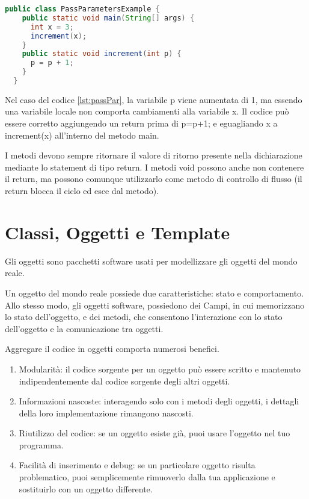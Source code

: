 \documentclass[a4paper,12pt,twoside]{book}
\begin{document}
\begin{lstlisting}[caption={Passaggio di parametri},
  label={lst:passPar},language=Java]
  public class PassParametersExample {
    public static void main(String[] args) {
      int x = 3;
      increment(x);
    }
    public static void increment(int p) {
      p = p + 1;
    }
  }
\end{lstlisting}

Nel caso del codice \ref{lst:passPar}, la variabile p viene aumentata
di 1, ma essendo una variabile locale non comporta cambiamenti alla
variabile x. Il codice può essere corretto aggiungendo un return prima
di p=p+1; e eguagliando x a increment(x) all'interno del metodo main.

I metodi devono sempre ritornare il valore di ritorno presente nella
dichiarazione mediante lo statement di tipo return. I metodi void
possono anche non contenere il return, ma possono comunque utilizzarlo
come metodo di controllo di flusso (il return blocca il ciclo ed esce
dal metodo).

\chapter{Classi, Oggetti e Template}
Gli oggetti sono pacchetti software usati per modellizzare gli oggetti
del mondo reale.

Un oggetto del mondo reale possiede due caratteristiche: stato e
comportamento. Allo stesso modo, gli oggetti software, possiedono dei
Campi, in cui memorizzano lo stato dell'oggetto, e dei metodi, che
consentono l'interazione con lo stato dell'oggetto e la comunicazione
tra oggetti.

Aggregare il codice in oggetti comporta numerosi benefici.
\begin{enumerate}
\item Modularità: il codice sorgente per un oggetto può essere scritto
  e mantenuto indipendentemente dal codice sorgente degli altri
  oggetti.
\item Informazioni nascoste: interagendo solo con i metodi degli
  oggetti, i dettagli della loro implementazione rimangono nascosti.
\item Riutilizzo del codice: se un oggetto esiste già, puoi usare
  l'oggetto nel tuo programma.
\item Facilità di inserimento e debug: se un particolare oggetto
  risulta problematico, puoi semplicemente rimuoverlo dalla tua
  applicazione e sostituirlo con un oggetto differente.
\end{enumerate}
\end{document}
